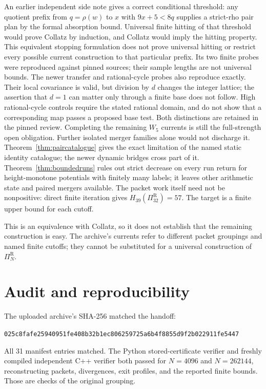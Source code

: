 \documentclass[11pt]{article}
\newcommand{\PiR}{\Pi^{\mathrm R}}
\begin{document}
An earlier independent side note gives a correct conditional threshold:
any quotient prefix from $q=\rho(w)$ to $x$ with $9x+5<8q$ supplies
a strict-rho pair plan by the formal absorption bound. Universal finite
hitting of that threshold would prove Collatz by induction, and Collatz
would imply the hitting property. This equivalent stopping formulation
does not prove universal hitting or restrict every possible current
construction to that particular prefix. Its two finite probes were
reproduced against pinned sources; their sample lengths are not universal
bounds.
The newer transfer and rational-cycle probes also reproduce exactly.
Their local covariance is valid, but division by $d$ changes the integer
lattice; the assertion that $d=1$ can matter only through a finite base
does not follow. High rational-cycle controls require the stated rational
domain, and do not show that a corresponding map passes a proposed base
test. Both distinctions are retained in the pinned review.
Completing the remaining $W_5$ currents is still the full-strength open
obligation. Further isolated merger families alone would not discharge it.
Theorem~\ref{thm:paircatalogue} gives the exact limitation of the named
static identity catalogue; the newer dynamic bridges cross part of it.
Theorem~\ref{thm:boundedruns} rules out strict decrease on every run
return for height-monotone potentials with finitely many labels; it
leaves other arithmetic state and paired mergers available.
The packet work itself need not be nonpositive: direct finite iteration gives
$H_{39}(\PiR_{32})=57$. The target is a finite upper bound for each cutoff.

This is an equivalence with Collatz, so it does not establish that the
remaining construction is easy. The archive's currents refer to different
packet groupings and named finite cutoffs; they cannot be substituted for a
universal construction of $\PiR_N$.

\section{Audit and reproducibility}
The uploaded archive's SHA-256 matched the handoff:
\begin{center}\small\texttt{025c8fafe25940951fe408b32b1ec806259725a6b4f8855d9f2b022911fe5447}\end{center}
All 31 manifest entries matched. The Python stored-certificate verifier and
freshly compiled independent C++ verifier both passed for $N=4096$ and
$N=262144$, reconstructing packets, divergences, exit profiles, and the
reported finite bounds. Those are checks of the original grouping.
\end{document}
